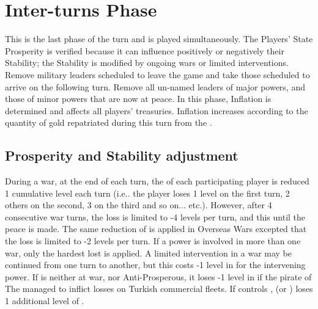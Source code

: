 \chapter{Inter-turns Phase}\label{chapter:Inter}

\InterPhase


This is the last phase of the turn and is played simultaneously.  The Players'
State Prosperity is verified because it can influence positively or negatively
their Stability; the Stability is modified by ongoing wars or limited
interventions.  Remove military leaders scheduled to leave the game and take
those scheduled to arrive on the following turn.  Remove all un-named leaders
of major powers, and those of minor powers that are now at peace.  In this
phase, Inflation is determined and affects all players' treasuries. Inflation
increases according to the quantity of gold repatriated during this turn from
the \ROTW.
\aparag[Sequence.]
\InterDetails



\section{Prosperity and Stability adjustment}

During a war, at the end of each turn, the \STAB of each participating player
is reduced 1 cumulative level each turn (i.e.. the player loses 1 level on the
first turn, 2 others on the second, 3 on the third and so
on... etc.). However, after 4 consecutive war turns, the loss is limited to -4
levels per turn, and this until the peace is made.
The same reduction of \STAB is applied in Overseas Wars excepted that the loss
is limited to -2 levels per turn.
 If a power is involved in more than one war, only the
hardest lost is applied.
A limited intervention in a war may be continued from one turn to another, but
this costs -1 level in \STAB for the intervening power.
If \TUR is neither at war, nor Anti-Prosperous, it loses -1 level in \STAB if
the pirate of The  managed to inflict losses on Turkish
commercial fleets.
\aparag[Vienna]
If \TUR controls , \HAB (\SPA or \AUS) loses 1 additional level
of \STAB.




